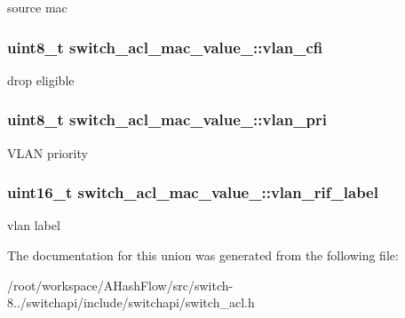 source mac \hypertarget{unionswitch__acl__mac__value___a6c38bed7dd33935228f75926adb49c97}{
\subsubsection[{vlan\+\_\+cfi}]{\setlength{\rightskip}{0pt plus 5cm}uint8\+\_\+t switch\+\_\+acl\+\_\+mac\+\_\+value\+\_\+\+::vlan\+\_\+cfi}}\label{unionswitch__acl__mac__value___a6c38bed7dd33935228f75926adb49c97}
drop eligible \hypertarget{unionswitch__acl__mac__value___a349ea85127b615ea30a93dbce4645636}{
\subsubsection[{vlan\+\_\+pri}]{\setlength{\rightskip}{0pt plus 5cm}uint8\+\_\+t switch\+\_\+acl\+\_\+mac\+\_\+value\+\_\+\+::vlan\+\_\+pri}}\label{unionswitch__acl__mac__value___a349ea85127b615ea30a93dbce4645636}
V\+L\+A\+N priority \hypertarget{unionswitch__acl__mac__value___ad27333d3735b51614c871e4947ab7abc}{
\subsubsection[{vlan\+\_\+rif\+\_\+label}]{\setlength{\rightskip}{0pt plus 5cm}uint16\+\_\+t switch\+\_\+acl\+\_\+mac\+\_\+value\+\_\+\+::vlan\+\_\+rif\+\_\+label}}\label{unionswitch__acl__mac__value___ad27333d3735b51614c871e4947ab7abc}
vlan label 

The documentation for this union was generated from the following file\+:\begin{DoxyCompactItemize}
\item 
/root/workspace/\+A\+Hash\+Flow/src/switch-\/8../switchapi/include/switchapi/switch\+\_\+acl.\+h\end{DoxyCompactItemize}
